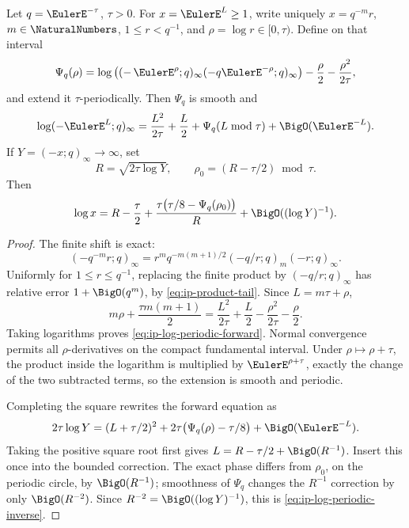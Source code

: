 \begin{theorem}
\label{thm:ip-log-periodic}
Let \(q=\EulerE^{-\tau}\), \(\tau>0\).  For \(x=\EulerE^L\geq1\), write uniquely
\(x=q^{-m}r\), \(m\in\NaturalNumbers\), \(1\leq r<q^{-1}\), and
\(\rho=\log r\in[0,\tau)\).  Define on that interval
\begin{equation}
 \Psi_q(\rho)=
 \log\left((-\,\EulerE^\rho;q)_\infty(-q\EulerE^{-\rho};q)_\infty\right)
 -\frac\rho2-\frac{\rho^2}{2\tau},
 \label{eq:ip-phase}
\end{equation}
and extend it \(\tau\)-periodically.  Then \(\Psi_q\) is smooth and
\begin{equation}
 \log(-\EulerE^L;q)_\infty
 =\frac{L^2}{2\tau}+\frac L2+\Psi_q(L\bmod\tau)
 +\BigO(\EulerE^{-L}).
 \label{eq:ip-log-periodic-forward}
\end{equation}
If \(Y=(-x;q)_\infty\to\infty\), set
\[
 R=\sqrt{2\tau\log Y},\qquad
 \rho_0=(R-\tau/2)\bmod\tau.
\]
Then
\begin{equation}
 \log x=R-\frac\tau2+
 \frac{\tau\bigl(\tau/8-\Psi_q(\rho_0)\bigr)}R
 +\BigO((\log Y)^{-1}).
 \label{eq:ip-log-periodic-inverse}
\end{equation}
\end{theorem}

\begin{proof}
The finite shift is exact:
\[
 (-q^{-m}r;q)_\infty
 =r^mq^{-m(m+1)/2}(-q/r;q)_m(-r;q)_\infty.
\]
Uniformly for \(1\leq r\leq q^{-1}\), replacing the finite product by
\((-q/r;q)_\infty\) has relative error \(1+\BigO(q^m)\), by
\cref{eq:ip-product-tail}.  Since \(L=m\tau+\rho\),
\[
 m\rho+\frac{\tau m(m+1)}2
 =\frac{L^2}{2\tau}+\frac L2-\frac{\rho^2}{2\tau}-\frac\rho2.
\]
Taking logarithms proves \cref{eq:ip-log-periodic-forward}.  Normal
convergence permits all \(\rho\)-derivatives on the compact fundamental
interval.  Under \(\rho\mapsto\rho+\tau\), the product inside the logarithm
is multiplied by \(\EulerE^{\rho+\tau}\), exactly the change of the two subtracted
terms, so the extension is smooth and periodic.

Completing the square rewrites the forward equation as
\[
 2\tau\log Y=(L+\tau/2)^2+
 2\tau\bigl(\Psi_q(\rho)-\tau/8\bigr)+\BigO(\EulerE^{-L}).
\]
Taking the positive square root first gives \(L=R-\tau/2+\BigO(R^{-1})\).
Insert this once into the bounded correction.  The exact phase differs from
\(\rho_0\), on the periodic circle, by \(\BigO(R^{-1})\); smoothness of
\(\Psi_q\) changes the \(R^{-1}\) correction by only \(\BigO(R^{-2})\).
Since \(R^{-2}=\BigO((\log Y)^{-1})\), this is
\cref{eq:ip-log-periodic-inverse}.
\end{proof}

